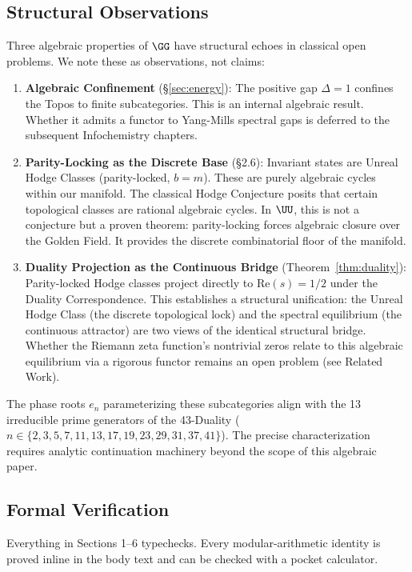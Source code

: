 \subsection{Structural Observations}

Three algebraic properties of $\GG$ have structural echoes in classical open problems. We note these as observations, not claims:

\begin{enumerate}
\item \textbf{Algebraic Confinement} (\S\ref{sec:energy}): The positive gap $\Delta = 1$ confines the Topos to finite subcategories. This is an internal algebraic result. Whether it admits a functor to Yang-Mills spectral gaps is deferred to the subsequent Infochemistry chapters.
\item \textbf{Parity-Locking as the Discrete Base} (\S2.6): Invariant states are Unreal Hodge Classes (parity-locked, $b=m$). These are purely algebraic cycles within our manifold. The classical Hodge Conjecture posits that certain topological classes are rational algebraic cycles. In $\UU$, this is not a conjecture but a proven theorem: parity-locking forces algebraic closure over the Golden Field. It provides the discrete combinatorial floor of the manifold.
\item \textbf{Duality Projection as the Continuous Bridge} (Theorem~\ref{thm:duality}): Parity-locked Hodge classes project directly to $\mathrm{Re}(s) = 1/2$ under the Duality Correspondence. This establishes a structural unification: the Unreal Hodge Class (the discrete topological lock) and the spectral equilibrium (the continuous attractor) are two views of the identical structural bridge. Whether the Riemann zeta function's nontrivial zeros relate to this algebraic equilibrium via a rigorous functor remains an open problem (see Related Work).
\end{enumerate}

The phase roots $e_n$ parameterizing these subcategories align with the 13 irreducible prime generators of the 43-Duality ($n \in \{2,3,5,7,11,13,17,19,23,29,31,37,41\}$). The precise characterization requires analytic continuation machinery beyond the scope of this algebraic paper.

\subsection{Formal Verification}

Everything in Sections 1--6 typechecks. Every modular-arithmetic identity is proved inline in the body text and can be checked with a pocket calculator.

